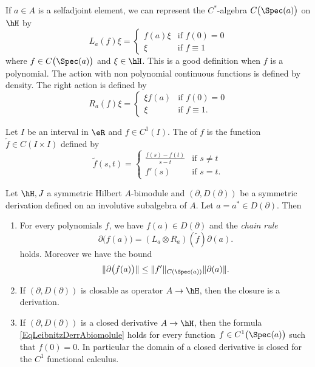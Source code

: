 If $a\in A$ is a selfadjoint element, we can represent the $C^*$-algebra $C\big( \Spec(a) \big)$ on $\hH$ by
\begin{equation}
	L_a(f)\xi=\begin{cases}
		f(a)\xi	&	\text{if }f(0)=0\\
		\xi	&	 \text{if }f\equiv 1
	\end{cases}
\end{equation}
where $f\in C\big( \Spec(a) \big)$ and $\xi\in\hH$. This is a good definition when $f$ is a polynomial. The action with non polynomial continuous functions is defined by density. The right action is defined by
\begin{equation}
	R_a(f)\xi=\begin{cases}
		\xi f(a)	&	\text{if }f(0)=0\\
		\xi	&	 \text{if }f\equiv 1.
	\end{cases}
\end{equation}

Let \(I\) be an interval in \(\eR\) and \(f\in C^1(I)\). The  of \(f\) is the function \(\tilde f\in C(I\times I)\) defined by
\begin{equation}
    \tilde f(s,t)=\begin{cases}
        \frac{ f(s)-f(t) }{ s-t }    &   \text{if }s\neq t\\
        f'(s)    &    \text{if }s=t.
    \end{cases}
\end{equation}

\begin{lemma}
    Let \(\hH,J\) a symmetric Hilbert \(A\)-bimodule and \( (\partial,D(\partial))\) be a symmetric derivation defined on an involutive subalgebra of \(A\). Let \(a=a^*\in D(\partial)\). Then
    \begin{enumerate}
        \item
            For every polynomials \(f\), we have \(f(a)\in D(\partial)\) and the \emph{chain rule}
            \begin{equation}        \label{EqLeibnitzDerrAbiomolule}
                \partial\big( f(a) \big)=(L_a\otimes R_a)(\tilde f)\partial(a).
            \end{equation}
            holds. Moreover we have the bound
            \begin{equation}        \label{EqBoundpartialfanfpnpa}
                \| \partial\big( f(a) \big) \|\leq \| f' \|_{C(\Spec(a))}\| \partial(a) \|.
            \end{equation}
        \item
            If \( (\partial,D(\partial))\) is closable as operator \(A\to\hH\), then the closure is a derivation.
        \item
            If \( (\partial,D(\partial))\) is a closed derivative \(A\to\hH\), then the formula \eqref{EqLeibnitzDerrAbiomolule} holds for every function \(f\in C^1\big( \Spec(a) \big)\) such that \(f(0)=0\). In particular the domain of a closed derivative is closed for the \(C^1\) functional calculus.
    \end{enumerate}

\end{lemma}


